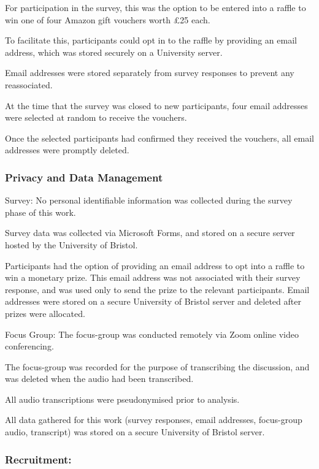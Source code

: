 \documentclass[manuscript,screen,review]{acmart}
\begin{document}
For participation in the survey, this was the option to be entered into a raffle to win one of four Amazon gift vouchers worth £25 each.

To facilitate this, participants could opt in to the raffle by providing an email address, which was stored securely on a University server. 

Email addresses were stored separately from survey responses to prevent any reassociated. 

At the time that the survey was closed to new participants, four email addresses were selected at random to receive the vouchers.

Once the selected participants had confirmed they received the vouchers, all email addresses were promptly deleted. 



\subsubsection{Privacy and Data Management}  


Survey:
No personal identifiable information was collected during the survey phase of this work.

Survey data was collected via Microsoft Forms, and stored on a secure server hosted by the University of Bristol.

Participants had the option of providing an email address to opt into a raffle to win a monetary prize. 
This email address was not associated with their survey response, and was used only to send the prize to the relevant participants. 
Email addresses were stored on a secure University of Bristol server and deleted after prizes were allocated.  

Focus Group:
The focus-group was conducted remotely via Zoom online video conferencing. 

The focus-group was recorded for the purpose of transcribing the discussion, and was deleted when the audio had been transcribed. 

All audio transcriptions were pseudonymised prior to analysis.

All data gathered for this work (survey responses, email addresses, focus-group audio, transcript) was stored on a secure University of Bristol server. 

\subsubsection{Recruitment:}  
\end{document}
